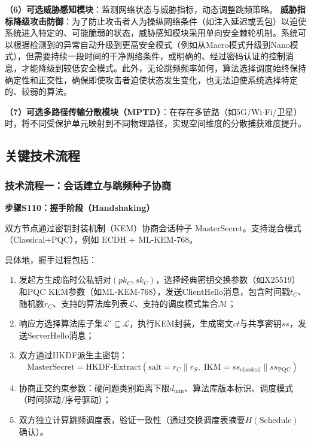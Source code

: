﻿\documentclass[12pt,a4paper]{article}
\begin{document}
\textbf{（6）可选威胁感知模块}：监测网络状态与威胁指标，动态调整跳频策略。
\textbf{威胁指标降级攻击防御}：为了防止攻击者人为操纵网络条件（如注入延迟或丢包）以迫使系统进入特定的、可能脆弱的状态，威胁感知模块采用单向安全棘轮机制。系统可以根据检测到的异常自动升级到更高安全模式（例如从Macro模式升级到Nano模式），但需要持续一段时间的干净网络条件，或明确的、经过密码认证的控制消息，才能降级到较低安全模式。此外，无论跳频频率如何，算法选择调度始终保持确定性和正交性，确保即使攻击者迫使状态发生变化，也无法迫使系统选择特定的、较弱的算法。

\textbf{（7）可选多路径传输分散模块（MPTD）}：在存在多链路（如5G/Wi-Fi/卫星）时，将不同受保护单元映射到不同物理路径，实现空间维度的分散捕获难度提升。

\subsection{关键技术流程}

\subsubsection{技术流程一：会话建立与跳频种子协商}

\textbf{步骤S110：握手阶段（Handshaking）}

双方节点通过密钥封装机制（KEM）协商会话种子 $\text{MasterSecret}$。支持混合模式（Classical+PQC），例如 ECDH + ML-KEM-768。

具体地，握手过程包括：
\begin{enumerate}[label=S110.\arabic*]
    \item 发起方生成临时公私钥对$(pk_C, sk_C)$，选择经典密钥交换参数（如X25519）和PQC KEM参数（如ML-KEM-768），发送ClientHello消息，包含时间戳$t_C$、随机数$r_C$、支持的算法库列表$\mathcal{L}$、支持的调度模式集合$\mathcal{M}$；
    \item 响应方选择算法库子集$\mathcal{L}' \subseteq \mathcal{L}$，执行KEM封装，生成密文$ct$与共享密钥$ss$，发送ServerHello消息；
    \item 双方通过HKDF派生主密钥：
    \begin{equation}
        \text{MasterSecret} = \text{HKDF-Extract}(\text{salt}=r_C \| r_S,\; \text{IKM}=ss_{\text{classical}} \| ss_{\text{PQC}})
    \end{equation}
    \item 协商正交约束参数：硬问题类别距离下限$d_{\min}$、算法库版本标识、调度模式（时间驱动/序号驱动）；
    \item 双方独立计算跳频调度表，验证一致性（通过交换调度表摘要$H(\text{Schedule})$确认）。
\end{enumerate}
\end{document}

